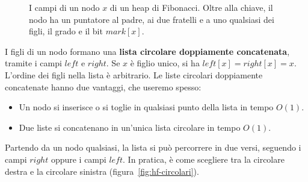 \begin{figure}[htbp]
\centering
{}
\caption{I campi di un nodo $x$ di un heap di Fibonacci. Oltre alla chiave, il nodo ha un puntatore al padre, ai due fratelli e a uno qualsiasi dei figli, il grado e il bit $\mathit{mark}[x]$.}
\label{fig:hf-nodo}
\end{figure}

I figli di un nodo formano una \textbf{lista circolare doppiamente concatenata}, tramite i campi $\mathit{left}$ e $\mathit{right}$. Se $x$ è figlio unico, si ha $\mathit{left}[x] = \mathit{right}[x] = x$. L'ordine dei figli nella lista è arbitrario. Le liste circolari doppiamente concatenate hanno due vantaggi, che useremo spesso:
\begin{itemize}
    \item Un nodo si inserisce o si toglie in qualsiasi punto della lista in tempo $O(1)$.
    \item Due liste si concatenano in un'unica lista circolare in tempo $O(1)$.
\end{itemize}

Partendo da un nodo qualsiasi, la lista si può percorrere in due versi, seguendo i campi $\mathit{right}$ oppure i campi $\mathit{left}$. In pratica, è come scegliere tra la circolare destra e la circolare sinistra (figura~\ref{fig:hf-circolari}).

